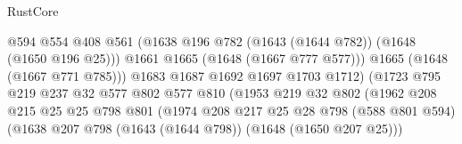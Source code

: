 \begin{lexlean}{RustCore}
\begin{coremodule}
                                            @594
                                            @554
                                            @408
                                            @561
                                            (@1638
                                              @196
                                              @782
                                              (@1643 (@1644 @782))
                                              (@1648 (@1650 @196 @25)))
                                            @1661
                                            @1665
                                            (@1648 (@1667 @777 @577)))
                                          @1665
                                          (@1648 (@1667 @771 @785)))
                                        @1683
                                        @1687
                                        @1692
                                        @1697
                                        @1703
                                        @1712)
                                      (@1723
                                        @795
                                        @219
                                        @237
                                        @32
                                        @577
                                        @802
                                        @577
                                        @810
                                        (@1953
                                          @219
                                          @32
                                          @802
                                          (@1962
                                            @208
                                            @215
                                            @25
                                            @25
                                            @798
                                            @801
                                            (@1974
                                              @208
                                              @217
                                              @25
                                              @28
                                              @798
                                              (@588 @801 @594)
                                              (@1638
                                                @207
                                                @798
                                                (@1643 (@1644 @798))
                                                (@1648 (@1650 @207 @25)))

\end{coremodule}
\end{lexlean}
